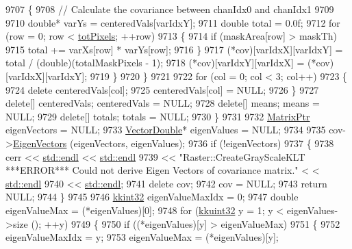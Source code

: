 \begin{DoxyCode}
9707       \{
9708         \textcolor{comment}{// Calculate the covariance between chanIdx0 and chanIdx1}
9709 
9710         \textcolor{keywordtype}{double}*  varYs = centeredVals[varIdxY];
9711         \textcolor{keywordtype}{double} total = 0.0f;
9712         \textcolor{keywordflow}{for}  (row = 0;  row < \hyperlink{class_k_k_b_1_1_raster_a9b08c4a0ca0a35435a478599635f1dc0}{totPixels};  ++row)
9713         \{
9714           \textcolor{keywordflow}{if}  (maskArea[row] > maskTh)
9715             total += varXs[row] * varYs[row];
9716         \}
9717         (*cov)[varIdxX][varIdxY] = total / (double)(totalMaskPixels - 1);
9718         (*cov)[varIdxY][varIdxX]  = (*cov)[varIdxX][varIdxY];
9719       \}
9720     \}
9721 
9722     \textcolor{keywordflow}{for}  (col = 0;  col < 3;  col++)
9723     \{
9724       \textcolor{keyword}{delete}  centeredVals[col];
9725       centeredVals[col] = NULL;
9726     \}
9727     \textcolor{keyword}{delete}[]  centeredVals;   centeredVals = NULL;
9728     \textcolor{keyword}{delete}[]  means;          means  = NULL;
9729     \textcolor{keyword}{delete}[]  totals;         totals = NULL;
9730   \}
9731  
9732   \hyperlink{class_k_k_b_1_1_matrix}{MatrixPtr}      eigenVectors = NULL;
9733   \hyperlink{namespace_k_k_b_a5906c207479607e5f450434095914a41}{VectorDouble}*  eigenValues  = NULL;
9734 
9735   cov->\hyperlink{class_k_k_b_1_1_matrix_a1d9e7525cebca179d2cefa3c68beb523}{EigenVectors} (eigenVectors, eigenValues);
9736   \textcolor{keywordflow}{if}  (!eigenVectors)
9737   \{
9738     cerr << \hyperlink{namespace_k_k_b_ad1f50f65af6adc8fa9e6f62d007818a8}{std::endl} << \hyperlink{namespace_k_k_b_ad1f50f65af6adc8fa9e6f62d007818a8}{std::endl} 
9739       << \textcolor{stringliteral}{"Raster::CreateGrayScaleKLT  ***ERROR***   Could not derive Eigen Vectors of covariance matrix."} <
      < \hyperlink{namespace_k_k_b_ad1f50f65af6adc8fa9e6f62d007818a8}{std::endl}
9740       << \hyperlink{namespace_k_k_b_ad1f50f65af6adc8fa9e6f62d007818a8}{std::endl};
9741     \textcolor{keyword}{delete}  cov;
9742     cov = NULL;
9743     \textcolor{keywordflow}{return} NULL;
9744   \}
9745 
9746   \hyperlink{namespace_k_k_b_a8fa4952cc84fda1de4bec1fbdd8d5b1b}{kkint32} eigenValueMaxIdx = 0;
9747   \textcolor{keywordtype}{double}  eigenValueMax    = (*eigenValues)[0];
9748   \textcolor{keywordflow}{for}  (\hyperlink{namespace_k_k_b_af8d832f05c54994a1cce25bd5743e19a}{kkuint32} y = 1;  y < eigenValues->size ();  ++y)
9749   \{
9750     \textcolor{keywordflow}{if}  ((*eigenValues)[y] > eigenValueMax)
9751     \{
9752       eigenValueMaxIdx = y;
9753       eigenValueMax = (*eigenValues)[y];

\end{DoxyCode}
